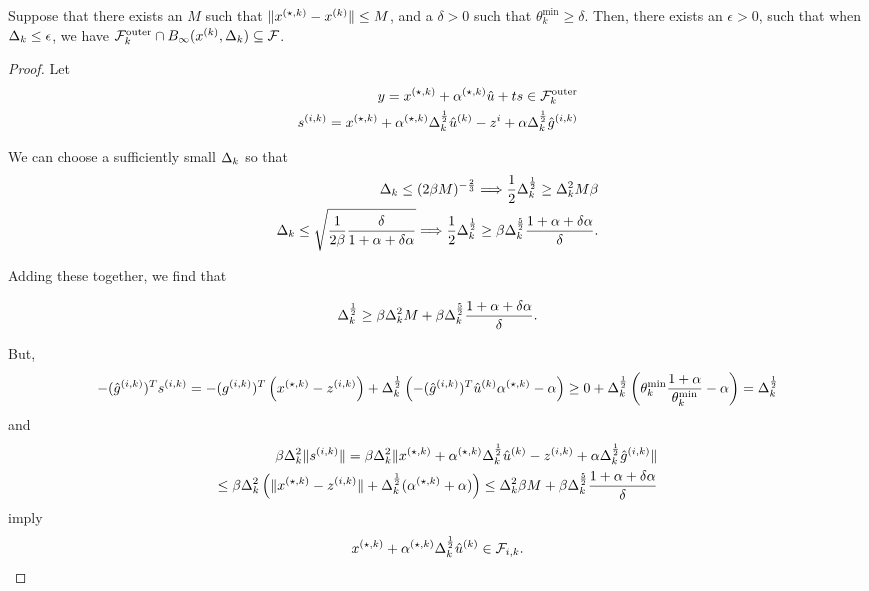 \color{red}

\begin{theorem}
Suppose that there exists an $M$ such that $\|{x^{(\star, k)}} - {x^{(k)}}\| \le M$, and a $\delta > 0$ such that $\theta^{\text{min}}_k \ge \delta$.
Then, there exists an $\epsilon > 0$, such that when $\Delta_k \le \epsilon$, we have $ {\mathcal {F}^{\text{outer}}_k} \cap B_{\infty}({x^{(k)}}, \Delta_k) \subseteq \mathcal F$.
\end{theorem}

\begin{proof}
Let
\begin{align*}
y = {x^{(\star, k)}} + {\alpha^{(\star, k)}} \hat u + ts \in {\mathcal {F}^{\text{outer}}_k} \\
s^{(i, k)} = {x^{(\star, k)}} + {\alpha^{(\star, k)}}\Delta_k^{\frac 1 2}{{\hat u}^{(k)}} - z^i + \alpha\Delta_k^{\frac 1 2}{{\hat g}^{(i, k)}}\\
\end{align*}

We can choose a sufficiently small $\Delta_k$ so that
\begin{align*}
\Delta_k \le (2\beta M)^{-\frac 2 3} \Longrightarrow \frac 1 2 \Delta_k^{\frac 1 2 } \ge \Delta_k^2 M\beta \\
\Delta_k \le \sqrt{\frac 1 {2\beta} \frac{\delta}{1 + \alpha + \delta\alpha}} \Longrightarrow \frac 1 2 \Delta_k^{\frac 1 2 } \ge \beta\Delta_k^{\frac 5 2}\frac{1 + \alpha + \delta\alpha}{\delta}.
\end{align*}

Adding these together, we find that

\begin{align*}
\Delta_k^{\frac 1 2 } \ge \beta \Delta_k^2 M + \beta \Delta_k^{\frac 5 2}\frac{1 + \alpha + \delta\alpha}{\delta}.
\end{align*}

But,
\begin{align*}
-({{\hat g}^{(i, k)}})^T s^{(i, k)} = -({g^{(i, k)}})^T \left({x^{(\star, k)}} - {z^{(i, k)}}\right) + \Delta_k^{\frac 1 2}\left(-({{\hat g}^{(i, k)}})^T{{\hat u}^{(k)}}{\alpha^{(\star, k)}} - \alpha\right)
\ge 0 + \Delta_k^{\frac 1 2}\left(\theta^{\text{min}}_k \frac{1 + \alpha}{\theta^{\text{min}}_k} - \alpha\right) = \Delta_k^{\frac 1 2 }\\
\end{align*}
and
\begin{align*}
\beta\Delta_k^2\|s^{(i, k)}\| = \beta\Delta_k^2\|{x^{(\star, k)}} + {\alpha^{(\star, k)}}\Delta_k^{\frac 1 2}{{\hat u}^{(k)}} - {z^{(i, k)}} + \alpha\Delta_k^{\frac 1 2}{{\hat g}^{(i, k)}} \| \\
\le \beta\Delta_k^2\left(\|{x^{(\star, k)}} - {z^{(i, k)}} \| + \Delta_k^{\frac 1 2} ({\alpha^{(\star, k)}} + \alpha)\right) 
\le \Delta_k^2\beta M + \beta \Delta_k^{\frac 5 2}\frac{1 + \alpha + \delta\alpha}{\delta}
\end{align*}
imply 
\begin{align*}
{x^{(\star, k)}} + {\alpha^{(\star, k)}}\Delta_k^{\frac 1 2}{{\hat u}^{(k)}} \in {\mathcal F_{i, k}}.
\end{align*}


\end{proof}
